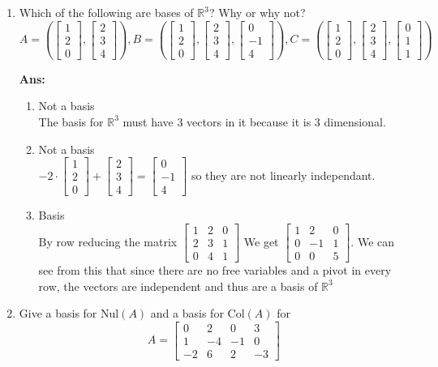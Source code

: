 \documentclass[12pt,oneside]{amsart}
\newcommand{\bv}{\mathbf{v}}
\newcommand{\R}{\mathbb{R}}
\newcommand\sol[1]{
\medskip
\begin{mdframed}
\textbf{Ans:\\} #1
\end{mdframed}
\medskip
}
\newcommand{\vd}[3]{\left[\begin{matrix} #1 \\ #2 \\ #3 \end{matrix}\right]}
\begin{document}
\begin{enumerate}
  \sol{
    Yes, they are linearly independant because in order to go from $\bv_0$ to $\bv_1$ to $\bv_2$ you would have to multiply by $t$ in each step. The multiplication allowed in vector spaces is only by constant scalars, not variables, and there is no other way to generate these elements from one another.
  }

\item
 Which of the following are bases of $\R^3$? Why or why not?
\[ A = ( \vd{1}{2}{0}, \vd{2}{3}{4} ), B = ( \vd{1}{2}{0}, \vd{2}{3}{4}, \vd{0}{-1}{4} ), C = (\vd{1}{2}{0}, \vd{2}{3}{4}, \vd{0}{1}{1} ) \]

\sol{
  \begin{enumerate}
    \item
      Not a basis\\ The basis for $\R^3$ must have 3 vectors in it because it is 3 dimensional.
    \item
      Not a basis\\ $-2\cdot\vd{1}{2}{0}+\vd{2}{3}{4}=\vd{0}{-1}{4}$ so they are not linearly independant.
    \item
      Basis\\ By row reducing the matrix $\left[\begin{matrix} 1 & 2 & 0 \\ 2 & 3 & 1\\ 0 & 4 & 1 \end{matrix}\right]$ We get $\left[\begin{array}{rrr}
1 & 2 & 0 \\
0 & -1& 1 \\
0 & 0 & 5
\end{array}\right]$. We can see from this that since there are no free variables and a pivot in every row, the vectors are independent and thus are a basis of $\R^3$ 
  \end{enumerate}
}


\item Give a basis for Nul$(A)$ and a basis for Col$(A)$ for
\[ A = \left[ \begin{matrix}
 0 & 2 & 0 & 3 \\
 1 & -4 & -1 & 0 \\
 -2 & 6 & 2 & -3
 \end{matrix} \right] \]



\end{enumerate}
\end{document}
